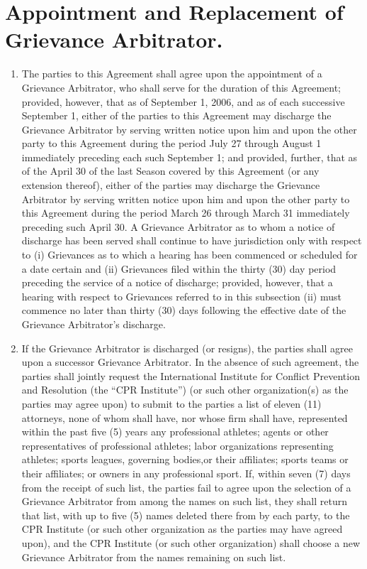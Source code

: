 \documentclass[
]{book}
\providecommand{\tightlist}{%
  \setlength{\itemsep}{0pt}\setlength{\parskip}{0pt}}
\begin{document}
\hypertarget{appointment-and-replacement-of-grievance-arbitrator.}{%
\section{Appointment and Replacement of Grievance Arbitrator.}\label{appointment-and-replacement-of-grievance-arbitrator.}}

\begin{enumerate}
\def\labelenumi{(\alph{enumi})}
\tightlist
\item
  The parties to this Agreement shall agree upon the appointment of a Grievance Arbitrator, who shall serve for the duration of this Agreement; provided, however, that as of September 1, 2006, and as of each successive September 1, either of the parties to this Agreement may discharge the Grievance Arbitrator by serving written notice upon him and upon the other party to this Agreement during the period July 27 through August 1 immediately preceding each such September 1; and provided, further, that as of the April 30 of the last Season covered by this Agreement (or any extension thereof), either of the parties may discharge the Grievance Arbitrator by serving written notice upon him and upon the other party to this Agreement during the period March 26 through March 31 immediately preceding such April 30. A Grievance Arbitrator as to whom a notice of discharge has been served shall continue to have jurisdiction only with respect to (i) Grievances as to which a hearing has been commenced or scheduled for a date certain and (ii) Grievances filed within the thirty (30) day period preceding the service of a notice of discharge; provided, however, that a hearing with respect to Grievances referred to in this subsection (ii) must commence no later than thirty (30) days following the effective date of the Grievance Arbitrator's discharge.
\item
  If the Grievance Arbitrator is discharged (or resigns), the parties shall agree upon a successor Grievance Arbitrator. In the absence of such agreement, the parties shall jointly request the International Institute for Conflict Prevention and Resolution (the ``CPR Institute'') (or such other organization(s) as the parties may agree upon) to submit to the parties a list of eleven (11) attorneys, none of whom shall have, nor whose firm shall have, represented within the past five (5) years any professional athletes; agents or other representatives of professional athletes; labor organizations representing athletes; sports leagues, governing bodies,or their affiliates; sports teams or their affiliates; or owners in any professional sport. If, within seven (7) days from the receipt of such list, the parties fail to agree upon the selection of a Grievance Arbitrator from among the names on such list, they shall return that list, with up to five (5) names deleted there from by each party, to the CPR Institute (or such other organization as the parties may have agreed upon), and the CPR Institute (or such other organization) shall choose a new Grievance Arbitrator from the names remaining on such list.
\end{enumerate}
\end{document}
